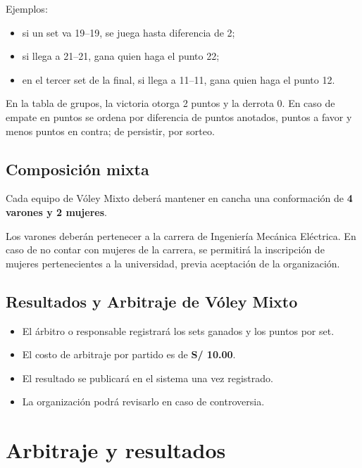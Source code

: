 \documentclass[12pt,a4paper]{article}
\begin{document}
	Ejemplos:
	
	\begin{itemize}
		\item si un set va 19--19, se juega hasta diferencia de 2;
		\item si llega a 21--21, gana quien haga el punto 22;
		\item en el tercer set de la final, si llega a 11--11, gana quien haga el punto 12.
	\end{itemize}
	
	En la tabla de grupos, la victoria otorga 2 puntos y la derrota 0. En caso de empate en puntos se ordena por diferencia de puntos anotados, puntos a favor y menos puntos en contra; de persistir, por sorteo.
	
	\subsection{Composición mixta}
	
	Cada equipo de Vóley Mixto deberá mantener en cancha una conformación de \textbf{4 varones y 2 mujeres}.
	
	Los varones deberán pertenecer a la carrera de Ingeniería Mecánica Eléctrica. En caso de no contar con mujeres de la carrera, se permitirá la inscripción de mujeres pertenecientes a la universidad, previa aceptación de la organización.
	
	\subsection{Resultados y Arbitraje de Vóley Mixto}
	
	\begin{itemize}
		\item El árbitro o responsable registrará los sets ganados y los puntos por set.
		\item El costo de arbitraje por partido es de \textbf{S/ 10.00}.
		\item El resultado se publicará en el sistema una vez registrado.
		\item La organización podrá revisarlo en caso de controversia.
	\end{itemize}
	
	\section{Arbitraje y resultados}
	
\end{document}
